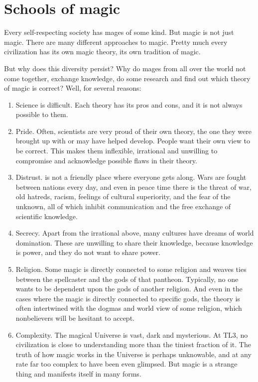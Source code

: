 \section{Schools of magic}
Every self-respecting society has mages of some kind. But magic is not just magic. There are many different approaches to magic. Pretty much every civilization has its own magic theory, its own tradition of magic. 

But why does this diversity persist? Why do mages from all over the world not come together, exchange knowledge, do some research and find out which theory of magic is correct? Well, for several reasons: 

\begin{enumerate}
  \item Science is difficult. 
    Each theory has its pros and cons, and it is not always possible to  them. 
  \item Pride. 
    Often, scientists are very proud of their own theory, the one they were brought up with or may have helped develop. People want their own view to be correct. This makes them inflexible, irrational and unwilling to compromise and acknowledge possible flaws in their theory. 
  \item Distrust. 
    \Miith{} is not a friendly place where everyone gets along. Wars are fought between nations every day, and even in peace time there is the threat of war, old hatreds, racism, feelings of cultural superiority, and the fear of the unknown, all of which inhibit communication and the free exchange of scientific knowledge. 
  \item Secrecy. 
    Apart from the irrational  above, many cultures have dreams of world domination. These are unwilling to share their knowledge, because knowledge is power, and they do not want to share power. 
  \item Religion. 
    Some magic is directly connected to some religion and weaves ties between the spellcaster and the gods of that pantheon. Typically, no one wants to be dependent upon the gods of another religion. And even in the cases where the magic is directly connected to specific gods, the theory is often intertwined with the dogmas and world view of some religion, which nonbelievers will be hesitant to accept. 
  \item Complexity. 
    The magical Universe is vast, dark and mysterious. At TL3, no civilization is close to understanding more than the tiniest fraction of it. The truth of how magic works in the Universe is perhaps unknowable, and at any rate far too complex to have been even glimpsed. But magic is a strange thing and manifests itself in many forms. 

\end{enumerate}
